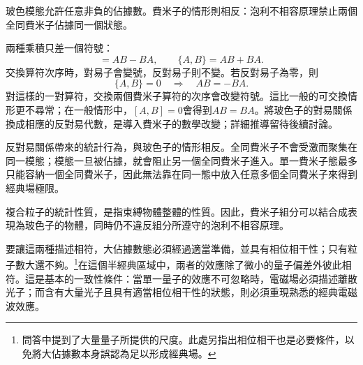 玻色模態允許任意非負的佔據數。費米子的情形則相反：泡利不相容原理禁止兩個全同費米子佔據同一個狀態。

\begin{classroomqa}
\end{classroomqa}

兩種乘積只差一個符號：
\begin{equation}
[A,B]=AB-BA,
\qquad
\{A,B\}=AB+BA.
\end{equation}
交換算符次序時，對易子會變號，反對易子則不變。若反對易子為零，則
\begin{equation}
\{A,B\}=0
\quad\Longrightarrow\quad
AB=-BA.
\end{equation}
對這樣的一對算符，交換兩個費米子算符的次序會改變符號。這比一般的可交換情形更不尋常；在一般情形中，\([A,B]=0\)會得到\(AB=BA\)。將玻色子的對易關係換成相應的反對易代數，是導入費米子的數學改變；詳細推導留待後續討論。

反對易關係帶來的統計行為，與玻色子的情形相反。全同費米子不會受激而聚集在同一模態；模態一旦被佔據，就會阻止另一個全同費米子進入。單一費米子態最多只能容納一個全同費米子，因此無法靠在同一態中放入任意多個全同費米子來得到經典場極限。

\begin{classroomqa}
\end{classroomqa}

複合粒子的統計性質，是指束縛物體整體的性質。因此，費米子組分可以結合成表現為玻色子的物體，同時仍不違反組分所遵守的泡利不相容原理。

\begin{classroomqa}
\end{classroomqa}

要讓這兩種描述相符，大佔據數態必須經過適當準備，並具有相位相干性；只有粒子數大還不夠。\footnote{問答中提到了大量量子所提供的尺度。此處另指出相位相干也是必要條件，以免將大佔據數本身誤認為足以形成經典場。}在這個半經典區域中，兩者的效應除了微小的量子偏差外彼此相符。這是基本的一致性條件：當單一量子的效應不可忽略時，電磁場必須描述離散光子；而含有大量光子且具有適當相位相干性的狀態，則必須重現熟悉的經典電磁波效應。
